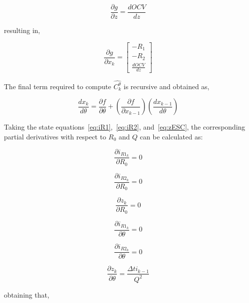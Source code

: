 \begin{equation}
    \frac{\partial g}{\partial z} = \frac{dOCV}{dz}
\end{equation}

resulting in,

\begin{equation}
    \frac{\partial g}{\partial x_k} = 
    \begin{bmatrix}
        - R_1 \\
        - R_2 \\
        \frac{dOCV}{dz}
    \end{bmatrix}
\end{equation}

The final term required to compute $\hat{C_k^\theta}$ is recursive and obtained as,

\begin{equation}
    \frac{d x_k}{d\theta} = \frac{\partial f}{\partial \theta} + (\frac{\partial f}{\partial x_{k-1}})(\frac{d x_{k-1}}{d\theta})
    \label{LastTermofChatTotalDerivative}
\end{equation}

Taking the state equations~\ref{eq:iR1},~\ref{eq:iR2}, and~\ref{eq:zESC}, the corresponding partial derivatives 
with respect to $R_0$ and $Q$ can be calculated as:

\begin{equation}
    \frac{\partial i_{R1_k}}{\partial R_0} = 0
\end{equation}

\begin{equation}
    \frac{\partial i_{R2_k}}{\partial R_0} = 0
\end{equation}

\begin{equation}
    \frac{\partial z_k}{\partial R_0} = 0
\end{equation}

\begin{equation}
    \frac{\partial i_{R1_k}}{\partial \theta} = 0
\end{equation}

\begin{equation}
    \frac{\partial i_{R2_k}}{\partial \theta} = 0
\end{equation}

\begin{equation}
    \frac{\partial z_k}{\partial \theta} = \frac{\Delta t i_{k-1}}{Q^2}
\end{equation}

obtaining that,

